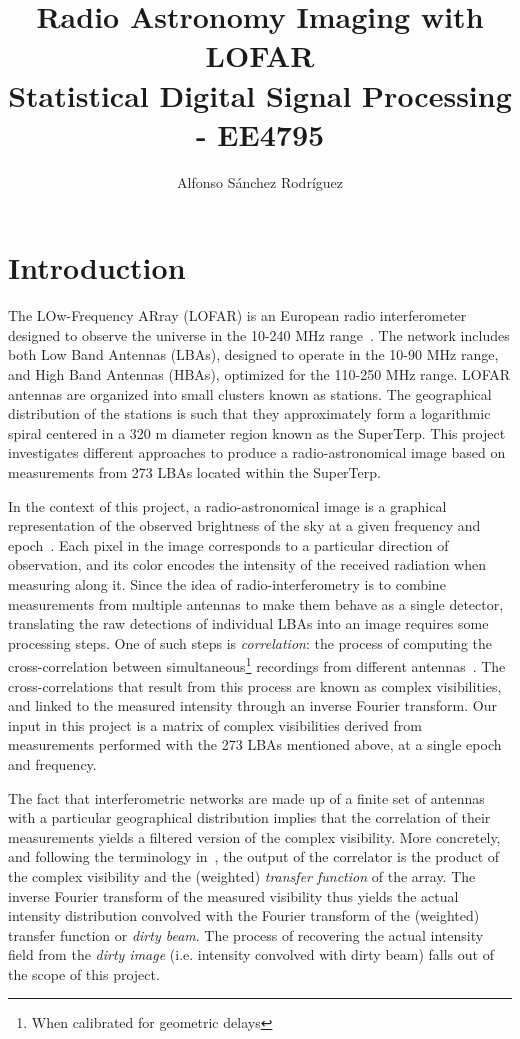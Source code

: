 \documentclass[11pt]{article}
\title{Radio Astronomy Imaging with LOFAR \\ Statistical Digital Signal Processing - EE4795}
\author{Alfonso Sánchez Rodríguez}
\begin{document}
\maketitle
\cleardoublepage
\setcounter{page}{1}

\section{Introduction}
\label{s:introduction}

The LOw-Frequency ARray (LOFAR) is an European radio interferometer designed to observe the universe in the 10-240 MHz range~\parencite{van_haarlem_lofar_2013}.
The network includes both Low Band Antennas (LBAs), designed to operate in the 10-90 MHz range, and High Band Antennas (HBAs), optimized for the 110-250 MHz range.
LOFAR antennas are organized into small clusters known as stations.
The geographical distribution of the stations is such that they approximately form a logarithmic spiral centered in a 320 m diameter region known as the SuperTerp.
This project investigates different approaches to produce a radio-astronomical image based on measurements from 273 LBAs located within the SuperTerp.

In the context of this project, a radio-astronomical image is a graphical representation of the observed brightness of the sky at a given frequency and epoch~\parencite{bhattacharyya_signal_2013}.
Each pixel in the image corresponds to a particular direction of observation, and its color encodes the intensity of the received radiation when measuring along it.
Since the idea of radio-interferometry is to combine measurements from multiple antennas to make them behave as a single detector, translating the raw detections of individual LBAs into an image requires some processing steps.
One of such steps is \emph{correlation}: the process of computing the cross-correlation between simultaneous\footnote{When calibrated for geometric delays} recordings from different antennas~\parencite{thompson_interferometry_2017}.
The cross-correlations that result from this process are known as complex visibilities, and linked to the measured intensity through an inverse Fourier transform.
Our input in this project is a matrix of complex visibilities derived from measurements performed with the 273 LBAs mentioned above, at a single epoch and frequency.

The fact that interferometric networks are made up of a finite set of antennas with a particular geographical distribution implies that the correlation of their measurements yields a filtered version of the complex visibility.
More concretely, and following the terminology in~\textcite{thompson_interferometry_2017}, the output of the correlator is the product of the complex visibility and the (weighted) \emph{transfer function} of the array.
The inverse Fourier transform of the measured visibility thus yields the actual intensity distribution convolved with the Fourier transform of the (weighted) transfer function or \emph{dirty beam}.
The process of recovering the actual intensity field from the \emph{dirty image} (i.e. intensity convolved with dirty beam) falls out of the scope of this project.
\end{document}
